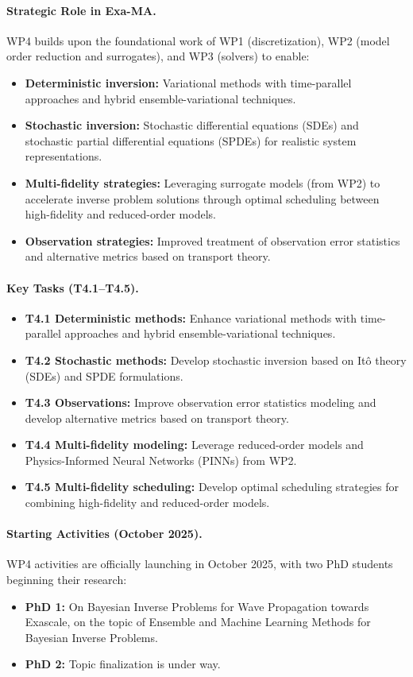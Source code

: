\paragraph{Strategic Role in Exa-MA.}
WP4 builds upon the foundational work of WP1 (discretization), WP2 (model order reduction and surrogates), and WP3 (solvers) to enable:
\begin{itemize}
\item \textbf{Deterministic inversion:} Variational methods with time-parallel approaches and hybrid ensemble-variational techniques.
\item \textbf{Stochastic inversion:} Stochastic differential equations (SDEs) and stochastic partial differential equations (SPDEs) for realistic system representations.
\item \textbf{Multi-fidelity strategies:} Leveraging surrogate models (from WP2) to accelerate inverse problem solutions through optimal scheduling between high-fidelity and reduced-order models.
\item \textbf{Observation strategies:} Improved treatment of observation error statistics and alternative metrics based on transport theory.
\end{itemize}

\paragraph{Key Tasks (T4.1--T4.5).}
\begin{itemize}
\item \textbf{T4.1 Deterministic methods:} Enhance variational methods with time-parallel approaches and hybrid ensemble-variational techniques.
\item \textbf{T4.2 Stochastic methods:} Develop stochastic inversion based on Itô theory (SDEs) and SPDE formulations.
\item \textbf{T4.3 Observations:} Improve observation error statistics modeling and develop alternative metrics based on transport theory.
\item \textbf{T4.4 Multi-fidelity modeling:} Leverage reduced-order models and Physics-Informed Neural Networks (PINNs) from WP2.
\item \textbf{T4.5 Multi-fidelity scheduling:} Develop optimal scheduling strategies for combining high-fidelity and reduced-order models.
\end{itemize}

\paragraph{Starting Activities (October 2025).}
WP4 activities are officially launching in October 2025, with two PhD students beginning their research:
\begin{itemize}
\item \textbf{PhD 1:} On Bayesian Inverse Problems for Wave Propagation towards Exascale, on the topic of Ensemble and Machine Learning Methods for Bayesian Inverse Problems. 
\item \textbf{PhD 2:} Topic finalization is under way.
\end{itemize}

